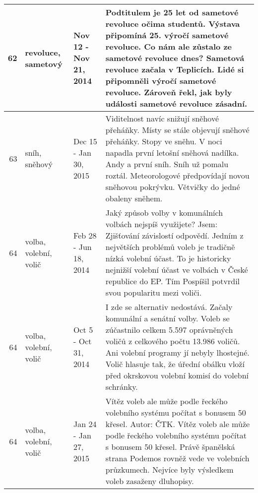 \begin{tabularx}{\linewidth}{r m{2.5cm} X m{8cm}}
62 & revoluce, sametový & Nov 12 - Nov 21, 2014 & Podtitulem je 25 let od sametové revoluce očima studentů. Výstava připomíná 25. výročí sametové revoluce. Co nám ale zůstalo ze sametové revoluce dnes? Sametová revoluce začala v Teplicích. Lidé si připomněli výročí sametové revoluce. Zároveň řekl, jak byly události sametové revoluce zásadní. \\ \midrule
63 & sníh, sněhový & Dec 15 - Jan 30, 2015 & Viditelnost navíc snižují sněhové přeháňky. Místy se stále objevují sněhové přeháňky. Stopy ve sněhu. V noci napadla první letošní sněhová nadílka. Andy a první sníh. Sníh už pomalu roztál. Meteorologové předpovídají novou sněhovou pokrývku. Větvičky do jedné obaleny sněhem. \\ \midrule
64 & volba, volební, volič & Feb 28 - Jun 18, 2014 & Jaký způsob volby v komunálních volbách nejspíš využijete? Jsem: Zjišťování závislostí odpovědí. Jedním z největších problémů voleb je tradičně nízká volební účast. To je historicky nejnižší volební účast ve volbách v České republice do EP. Tím Pospíšil potvrdil svou popularitu mezi voliči. \\ \midrule
64 & volba, volební, volič & Oct 5 - Oct 31, 2014 & I zde se alternativ nedostává. Začaly komunální a senátní volby. Voleb se zúčastnilo celkem 5.597 oprávněných voličů z celkového počtu 13.986 voličů. Ani volební programy jí nebyly lhostejné. Volič hlasuje tak, že úřední obálku vloží před okrskovou volební komisí do volební schránky. \\ \midrule
64 & volba, volební, volič & Jan 24 - Jan 27, 2015 & Vítěz voleb ale může podle řeckého volebního systému počítat s bonusem 50 křesel. Autor: ČTK. Vítěz voleb ale může podle řeckého volebního systému počítat s bonusem 50 křesel. Právě španělská strana Podemos rovněž vede ve volebních průzkumech. Nejvíce byly výsledkem voleb zasaženy dluhopisy. \\ \midrule


\bottomrule[1.25pt]
\end{tabularx}
